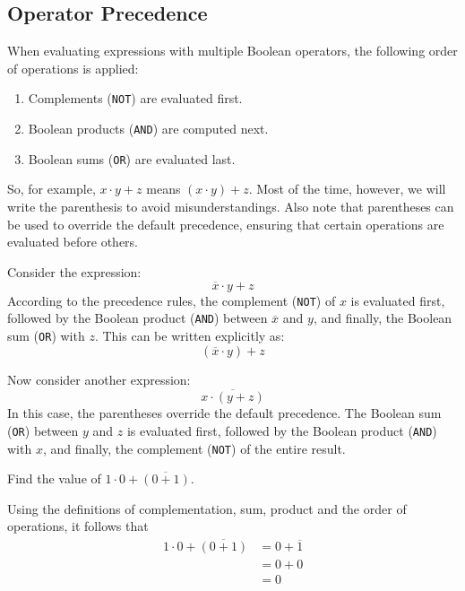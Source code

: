 \subsection*{Operator Precedence}
When evaluating expressions with multiple Boolean operators, the following order of operations is applied:
\begin{enumerate}
    \item Complements (\texttt{NOT}) are evaluated first.
    \item Boolean products (\texttt{AND}) are computed next.
    \item Boolean sums (\texttt{OR}) are evaluated last.
\end{enumerate}

So, for example, $x \cdot y+z$ means $(x \cdot y)+z$. Most of the time, however, we will write the parenthesis to avoid misunderstandings. Also note that parentheses can be used to override the default precedence, ensuring that certain operations are evaluated before others.

Consider the expression:
\[
\overline{x} \cdot y + z
\]
According to the precedence rules, the complement (\texttt{NOT}) of $x$ is evaluated first, followed by the Boolean product (\texttt{AND}) between $\overline{x}$ and $y$, and finally, the Boolean sum (\texttt{OR}) with $z$. This can be written explicitly as:
\[
(\overline{x} \cdot y) + z
\]

Now consider another expression:
\[
\overline{x \cdot (y + z)}
\]
In this case, the parentheses override the default precedence. The Boolean sum (\texttt{OR}) between $y$ and $z$ is evaluated first, followed by the Boolean product (\texttt{AND}) with $x$, and finally, the complement (\texttt{NOT}) of the entire result.

\begin{example}
    Find the value of $1 \cdot 0+\overline{(0+1)}$.

    \begin{solution}
        Using the definitions of complementation, sum, product and the order of operations, it follows that
        \[
        \begin{aligned}
        1 \cdot 0+\overline{(0+1)} & =0+\overline{1} \\
        & =0+0 \\
        & =0
        \end{aligned}
        \]
    \end{solution}
    \label{ex4.1}
\end{example}

